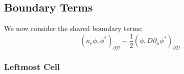 \documentclass[11pt]{article}
\newcommand{\be}{\begin{equation*}}
\newcommand{\ee}{\end{equation*}}
\newcommand{\eqt}[1]{Eq. (\ref{#1})}
\newcommand{\pep}{\, .}
\begin{document}

\subsection{Boundary Terms}

We now consider the shared boundary terms:
\be
(\kappa_{e}\phi,\phi^*)_{\partial \mathcal D} -\frac{1}{2}(\phi ,D\partial_n \phi^*)_{\partial \mathcal D}
\ee

\subsubsection{Leftmost Cell}
\end{document}
